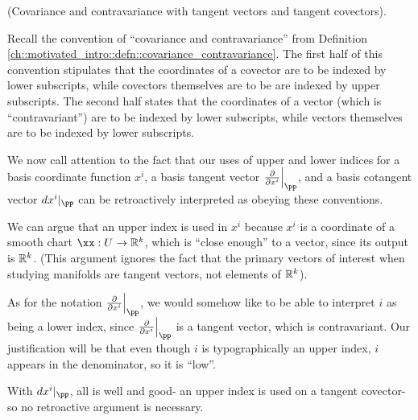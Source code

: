 \begin{remark}
    (Covariance and contravariance with tangent vectors and tangent covectors).
    
    Recall the convention of ``covariance and contravariance'' from Definition \ref{ch::motivated_intro::defn::covariance_contravariance}. The first half of this convention stipulates that the coordinates of a covector are to be indexed by lower subscripts, while covectors themselves are to be are indexed by upper subscripts. The second half states that the coordinates of a vector (which is ``contravariant'') are to be indexed by lower subscripts, while vectors themselves are to be indexed by lower subscripts.
    
    We now call attention to the fact that our uses of upper and lower indices for a basis coordinate function $x^i$, a basis tangent vector $\frac{\pd}{\pd x^i}\Big|_\pp$, and a basis cotangent vector $dx^i|_\pp$ can be retroactively interpreted as obeying these conventions. 
    
    We can argue that an upper index is used in $x^i$ because $x^i$ is a coordinate of a smooth chart $\xx:U \rightarrow \R^k$, which is ``close enough'' to a vector, since its output is $\mathbb{R}^k$. (This argument ignores the fact that the primary vectors of interest when studying manifolds are tangent vectors, not elements of $\mathbb{R}^k$).
    
    As for the notation $\frac{\pd}{\pd x^i}\Big|_\pp$, we would somehow like to be able to interpret $i$ as being a lower index, since $\frac{\pd}{\pd x^i}\Big|_\pp$ is a tangent vector, which is contravariant. Our justification will be that even though $i$ is typographically an upper index, $i$ appears in the denominator, so it is ``low''.
    
    With $dx^i|_\pp$, all is well and good- an upper index is used on a tangent covector- so no retroactive argument is necessary. 
\end{remark}

